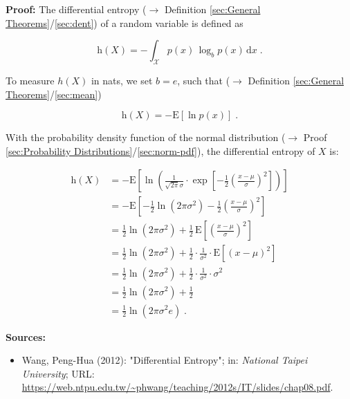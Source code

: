 \documentclass[a4paper,12pt,twoside]{book}
\begin{document}
\vspace{1em}
\textbf{Proof:} The differential entropy ($\rightarrow$ Definition \ref{sec:General Theorems}/\ref{sec:dent}) of a random variable is defined as

\begin{equation} \label{eq:norm-dent-dent}
\mathrm{h}(X) = - \int_{\mathcal{X}} p(x) \, \log_b p(x) \, \mathrm{d}x \; .
\end{equation}

To measure $h(X)$ in nats, we set $b = e$, such that ($\rightarrow$ Definition \ref{sec:General Theorems}/\ref{sec:mean})

\begin{equation} \label{eq:norm-dent-dent-nats}
\mathrm{h}(X) = - \mathrm{E}\left[ \ln p(x) \right] \; .
\end{equation}

With the probability density function of the normal distribution ($\rightarrow$ Proof \ref{sec:Probability Distributions}/\ref{sec:norm-pdf}), the differential entropy of $X$ is:

\begin{equation} \label{eq:norm-dent-mvn-dent-s1}
\begin{split}
\mathrm{h}(X) &= - \mathrm{E}\left[ \ln \left( \frac{1}{\sqrt{2 \pi} \sigma} \cdot \exp \left[ -\frac{1}{2} \left( \frac{x-\mu}{\sigma} \right)^2 \right] \right) \right] \\
&= - \mathrm{E}\left[ - \frac{1}{2} \ln(2\pi\sigma^2) - \frac{1}{2} \left( \frac{x-\mu}{\sigma} \right)^2 \right] \\
&= \frac{1}{2} \ln(2 \pi \sigma^2) + \frac{1}{2} \, \mathrm{E}\left[ \left( \frac{x-\mu}{\sigma} \right)^2 \right] \\
&= \frac{1}{2} \ln(2 \pi \sigma^2) + \frac{1}{2} \cdot \frac{1}{\sigma^2} \cdot \mathrm{E}\left[ (x-\mu)^2 \right] \\
&= \frac{1}{2} \ln(2 \pi \sigma^2) + \frac{1}{2} \cdot \frac{1}{\sigma^2} \cdot \sigma^2 \\
&= \frac{1}{2} \ln(2 \pi \sigma^2) + \frac{1}{2} \\
&= \frac{1}{2} \ln(2 \pi \sigma^2 e) \; .
\end{split}
\end{equation}


\vspace{1em}
\textbf{Sources:}
\begin{itemize}
\item Wang, Peng-Hua (2012): "Differential Entropy"; in: \textit{National Taipei University}; URL: \url{https://web.ntpu.edu.tw/~phwang/teaching/2012s/IT/slides/chap08.pdf}.
\end{itemize}
\end{document}
